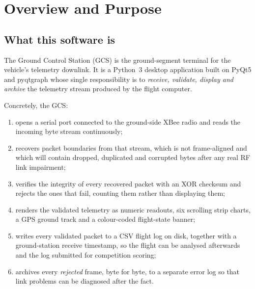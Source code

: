 \documentclass[11pt,a4paper]{article}
\begin{document}
\tableofcontents
\clearpage
\listoffigures
\listoftables
\clearpage

\section{Overview and Purpose}

\subsection{What this software is}

The Ground Control Station (GCS) is the ground-segment terminal for the
vehicle's telemetry downlink. It is a Python~3 desktop application built on
PyQt5 and pyqtgraph whose single responsibility is to \emph{receive, validate,
display and archive} the telemetry stream produced by the flight computer.

Concretely, the GCS:

\begin{enumerate}[label=(\alph*)]
  \item opens a serial port connected to the ground-side XBee radio and reads
        the incoming byte stream continuously;
  \item recovers packet boundaries from that stream, which is not
        frame-aligned and which will contain dropped, duplicated and corrupted
        bytes after any real RF link impairment;
  \item verifies the integrity of every recovered packet with an XOR checksum
        and rejects the ones that fail, counting them rather than displaying
        them;
  \item renders the validated telemetry as numeric readouts, six scrolling
        strip charts, a GPS ground track and a colour-coded flight-state
        banner;
  \item writes every validated packet to a CSV flight log on disk, together
        with a ground-station receive timestamp, so the flight can be analysed
        afterwards and the log submitted for competition scoring;
  \item archives every \emph{rejected} frame, byte for byte, to a separate
        error log so that link problems can be diagnosed after the fact.
\end{enumerate}
\end{document}
